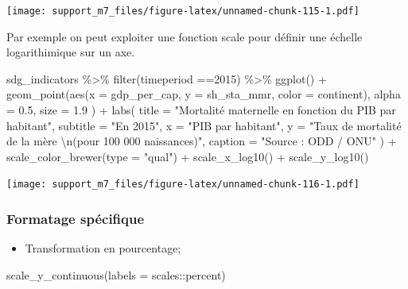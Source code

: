 \documentclass[
]{book}
\newenvironment{Shaded}{\begin{snugshade}}{\end{snugshade}}
\newcommand{\AttributeTok}[1]{\textcolor[rgb]{0.77,0.63,0.00}{#1}}
\newcommand{\DecValTok}[1]{\textcolor[rgb]{0.00,0.00,0.81}{#1}}
\newcommand{\FloatTok}[1]{\textcolor[rgb]{0.00,0.00,0.81}{#1}}
\newcommand{\FunctionTok}[1]{\textcolor[rgb]{0.00,0.00,0.00}{#1}}
\newcommand{\NormalTok}[1]{#1}
\newcommand{\SpecialCharTok}[1]{\textcolor[rgb]{0.00,0.00,0.00}{#1}}
\newcommand{\StringTok}[1]{\textcolor[rgb]{0.31,0.60,0.02}{#1}}
\providecommand{\tightlist}{%
  \setlength{\itemsep}{0pt}\setlength{\parskip}{0pt}}
\begin{document}
\texttt{[image: support\_m7\_files/figure-latex/unnamed-chunk-115-1.pdf]}

Par exemple on peut exploiter une fonction scale pour définir une échelle logarithimique sur un axe.

\begin{Shaded}
\begin{Highlighting}[]
\NormalTok{sdg\_indicators }\SpecialCharTok{\%\textgreater{}\%} 
  \FunctionTok{filter}\NormalTok{(timeperiod }\SpecialCharTok{==}\DecValTok{2015}\NormalTok{) }\SpecialCharTok{\%\textgreater{}\%} 
  \FunctionTok{ggplot}\NormalTok{() }\SpecialCharTok{+}
  \FunctionTok{geom\_point}\NormalTok{(}\FunctionTok{aes}\NormalTok{(}\AttributeTok{x =}\NormalTok{ gdp\_per\_cap, }
                 \AttributeTok{y =}\NormalTok{ sh\_sta\_mmr,}
                 \AttributeTok{color =}\NormalTok{ continent),}
    \AttributeTok{alpha =} \FloatTok{0.5}\NormalTok{, }
    \AttributeTok{size =} \FloatTok{1.9}
\NormalTok{  ) }\SpecialCharTok{+}
  \FunctionTok{labs}\NormalTok{(}
    \AttributeTok{title =} \StringTok{"Mortalité maternelle en fonction du PIB par habitant"}\NormalTok{,}
    \AttributeTok{subtitle =} \StringTok{"En 2015"}\NormalTok{,}
    \AttributeTok{x =} \StringTok{"PIB par habitant"}\NormalTok{,}
    \AttributeTok{y =} \StringTok{"Taux de mortalité de la mère }\SpecialCharTok{\textbackslash{}n}\StringTok{(pour 100 000 naissances)"}\NormalTok{,}
    \AttributeTok{caption =} \StringTok{"Source : ODD / ONU"}
\NormalTok{  ) }\SpecialCharTok{+}
  \FunctionTok{scale\_color\_brewer}\NormalTok{(}\AttributeTok{type =} \StringTok{"qual"}\NormalTok{) }\SpecialCharTok{+}
  \FunctionTok{scale\_x\_log10}\NormalTok{() }\SpecialCharTok{+}
  \FunctionTok{scale\_y\_log10}\NormalTok{()}
\end{Highlighting}
\end{Shaded}

\texttt{[image: support\_m7\_files/figure-latex/unnamed-chunk-116-1.pdf]}

\hypertarget{formatage-spuxe9cifique}{%
\subsubsection{Formatage spécifique}\label{formatage-spuxe9cifique}}

\begin{itemize}
\tightlist
\item
  Transformation en pourcentage;
\end{itemize}

\begin{Shaded}
\begin{Highlighting}[]
  \FunctionTok{scale\_y\_continuous}\NormalTok{(}\AttributeTok{labels =}\NormalTok{ scales}\SpecialCharTok{::}\NormalTok{percent)}
\end{Highlighting}
\end{Shaded}
\end{document}
